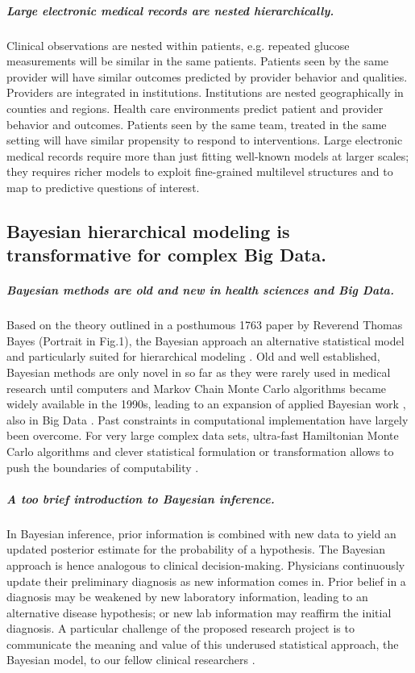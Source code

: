 \documentclass[11pt,notitlepage]{article}
\begin{document}
\subparagraph{Large electronic medical records are nested hierarchically.}
Clinical observations are nested within patients, e.g. repeated glucose measurements will be similar in the same patients. Patients seen by the same provider will have similar outcomes predicted by provider behavior and qualities. Providers are integrated in institutions. Institutions are nested geographically in counties and regions. Health care environments predict patient and provider behavior and outcomes. Patients seen by the same team, treated in the same setting will have similar propensity to respond to interventions. Large electronic medical records require more than just fitting well-known models at larger scales; they requires richer models to exploit fine-grained multilevel structures and to map to predictive questions of interest.


\subsection*{Bayesian hierarchical modeling is transformative for complex Big Data.}

\subparagraph*{Bayesian methods are old and new in health sciences and Big Data.}
Based on the theory outlined in a posthumous 1763 paper by Reverend Thomas Bayes (Portrait in Fig.1)\cite{Thomas_Bayes}, the Bayesian approach an alternative statistical model and particularly suited for hierarchical modeling \cite{Carlin_1349763,Sutton_2012}. Old and well established, Bayesian methods are only novel in so far as they were rarely used in medical research until computers and Markov Chain Monte Carlo algorithms became widely available in the 1990s, leading to an expansion of applied Bayesian work \cite{Ashby_16947924,Spiegelhalter_11134920}, also in Big Data \cite{Yoo_24987556}. Past constraints in computational implementation have largely been overcome. For very large complex data sets,  ultra-fast Hamiltonian Monte Carlo algorithms \cite{Stan_Software_2014} and clever statistical formulation or transformation allows to push the boundaries of computability \cite{Gelman-Hill_2014}.  

\subparagraph*{A too brief introduction to Bayesian inference.}
In Bayesian inference, prior information is combined with new data to yield an updated posterior estimate for the probability of a hypothesis. The Bayesian approach is hence analogous to clinical decision-making. Physicians continuously update their preliminary diagnosis as new information comes in. Prior belief in a diagnosis may be weakened by new laboratory information, leading to an alternative disease hypothesis; or new lab information may reaffirm the initial diagnosis. A particular challenge of the proposed research project is to communicate the meaning and value of this underused statistical approach, the Bayesian model, to our fellow clinical researchers \cite{Kruschke_22774788}.
\end{document}
